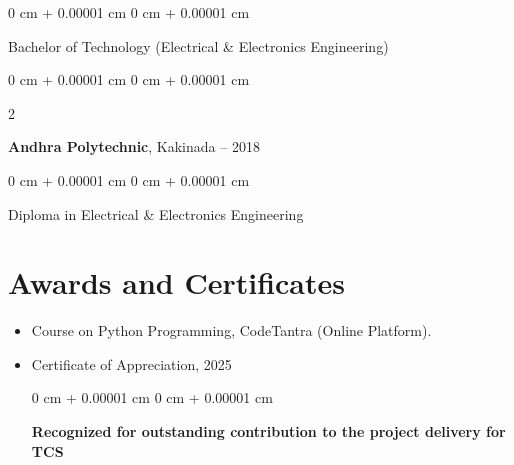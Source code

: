 \documentclass[10pt, letterpaper]{article}
\newenvironment{highlightsforbulletentries}{
    \begin{itemize}[
        topsep=0.10 cm,
        parsep=0.10 cm,
        partopsep=0pt,
        itemsep=0pt,
        leftmargin=10pt
    ]
}{
    \end{itemize}
} %
\newenvironment{onecolentry}{
    \begin{adjustwidth}{
        0 cm + 0.00001 cm
    }{
        0 cm + 0.00001 cm
    }
}{
    \end{adjustwidth}
} %
\newenvironment{twocolentry}[2][]{
    \onecolentry
    \def\secondColumn{#2}
    \setcolumnwidth{\fill, 4.5 cm}
    \begin{paracol}{2}
}{
    \switchcolumn \raggedleft \secondColumn
    \end{paracol}
    \endonecolentry
} %
\begin{document}
        \vspace{0.10 cm}
        \begin{onecolentry}
            Bachelor of Technology (Electrical \& Electronics Engineering)
        \end{onecolentry}

        \vspace{0.2 cm}
        
        \begin{twocolentry}{
            2015 – 2018
        }
            \textbf{Andhra Polytechnic}, Kakinada\end{twocolentry}

        \vspace{0.10 cm}
        \begin{onecolentry}
            Diploma in Electrical \& Electronics Engineering
        \end{onecolentry}
        



    

    \section{Awards and Certificates}

    \begin{highlightsforbulletentries}


        \item Course on Python Programming, CodeTantra (Online Platform).

        \item Certificate of Appreciation, 2025
        \begin{onecolentry}
            \textbf {Recognized for outstanding contribution to the project delivery for TCS}
        \end{onecolentry}


        \end{highlightsforbulletentries}
    
    


    
\end{document}
